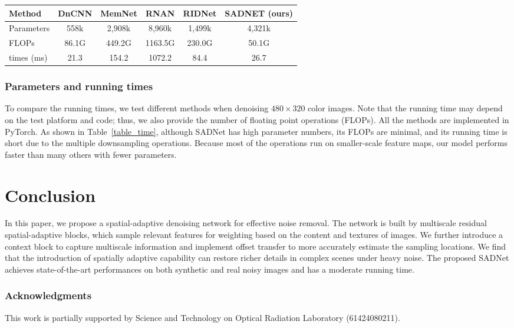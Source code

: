 \documentclass[runningheads]{llncs}
\begin{document}
\begin{table*}
\setlength{\tabcolsep}{4pt}
\begin{center}
\caption{Parameters and time comparisons on $480\times 320$ color images}
\label{table_time}
\begin{tabular}{lccccc}
\hline
Method & DnCNN & MemNet & RNAN & RIDNet & SADNET (ours)\\
\hline\hline
Parameters & 558k & 2,908k & 8,960k & 1,499k & 4,321k \\
FLOPs & 86.1G & 449.2G & 1163.5G & 230.0G & 50.1G \\
times (ms) & 21.3 & 154.2 & 1072.2 & 84.4 & 26.7 \\
\hline
\end{tabular}
\end{center}
\end{table*}

\subsubsection{Parameters and running times}

To compare the running times, we test different methods when denoising $480\times 320$ color images. Note that the running time may depend on the test platform and code; thus, we also provide the number of floating point operations (FLOPs). All the methods are implemented in PyTorch. As shown in Table~\ref{table_time}, although SADNet has high parameter numbers, its FLOPs are minimal, and its running time is short due to the multiple downsampling operations. Because most of the operations run on smaller-scale feature maps, our model performs faster than many others with fewer parameters.

\section{Conclusion}

In this paper, we propose a spatial-adaptive denoising network for effective noise removal. The network is built by multiscale residual spatial-adaptive blocks, which sample relevant features for weighting based on the content and textures of images. We further introduce a context block to capture multiscale information and implement offset transfer to more accurately estimate the sampling locations. We find that the introduction of spatially adaptive capability can restore richer details in complex scenes under heavy noise. The proposed SADNet achieves state-of-the-art performances on both synthetic and real noisy images and has a moderate running time.   

\subsubsection{Acknowledgments}

This work is partially supported by Science and Technology on Optical Radiation Laboratory (61424080211).





\end{document}

